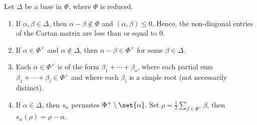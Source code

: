 Let $\Delta$ be a base in $\Phi$, where $\Phi$ is reduced.

\begin{enumerate}[label=(\alph*)]
	\item If $\alpha, \beta \in \Delta$, then $\alpha - \beta \notin \Phi$ and
		$(\alpha, \beta) \leq 0$. Hence, the non-diagonal entries of
		the Cartan matrix are less than or equal to $0$.
	\item If $\alpha \in \Phi^+$ and $\alpha \notin\Delta$, then
		$\alpha - \beta \in \Phi^+$ for some $\beta \in \Delta$.
	\item Each $\alpha \in \Phi^+$ is of the form $\beta_1+\cdots+\beta_s$, where
		each partial sum $\beta_1+\cdots+\beta_i \in \Phi^+$ and where
		each $\beta_i$ is a simple root (not necessarily distinct).
	\item If $\alpha \in \Delta$, then $s_\alpha$ permutes $\Phi^+\setminus\set{\alpha}$.
		Set $\rho = \frac{1}{2}\sum_{\beta \in \Phi^+}\beta$, then $s_\alpha(\rho) = \rho-\alpha$.
\end{enumerate}
